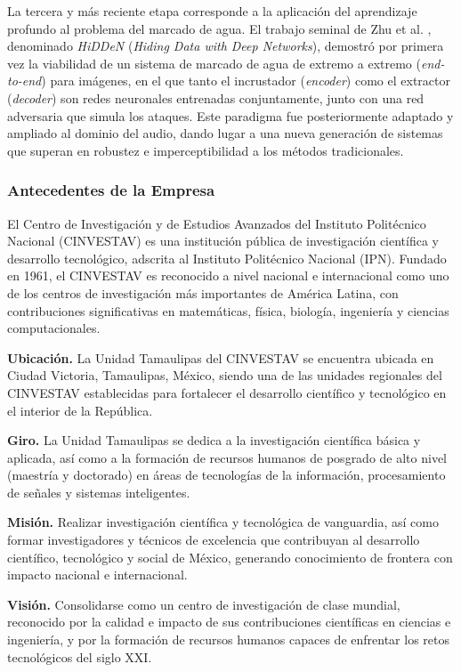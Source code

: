 La tercera y más reciente etapa corresponde a la aplicación del aprendizaje profundo al problema del marcado de agua. El trabajo seminal de Zhu et al. \cite{zhu2018hidden}, denominado \textit{HiDDeN} (\textit{Hiding Data with Deep Networks}), demostró por primera vez la viabilidad de un sistema de marcado de agua de extremo a extremo (\textit{end-to-end}) para imágenes, en el que tanto el incrustador (\textit{encoder}) como el extractor (\textit{decoder}) son redes neuronales entrenadas conjuntamente, junto con una red adversaria que simula los ataques. Este paradigma fue posteriormente adaptado y ampliado al dominio del audio, dando lugar a una nueva generación de sistemas que superan en robustez e imperceptibilidad a los métodos tradicionales.
\subsubsection{Antecedentes de la Empresa}
\label{subsec:antecedentes_empresa}

El Centro de Investigación y de Estudios Avanzados del Instituto Politécnico Nacional (CINVESTAV) es una institución pública de investigación científica y desarrollo tecnológico, adscrita al Instituto Politécnico Nacional (IPN). Fundado en 1961, el CINVESTAV es reconocido a nivel nacional e internacional como uno de los centros de investigación más importantes de América Latina, con contribuciones significativas en matemáticas, física, biología, ingeniería y ciencias computacionales.

\textbf{Ubicación.} La Unidad Tamaulipas del CINVESTAV se encuentra ubicada en Ciudad Victoria, Tamaulipas, México, siendo una de las unidades regionales del CINVESTAV establecidas para fortalecer el desarrollo científico y tecnológico en el interior de la República.

\textbf{Giro.} La Unidad Tamaulipas se dedica a la investigación científica básica y aplicada, así como a la formación de recursos humanos de posgrado de alto nivel (maestría y doctorado) en áreas de tecnologías de la información, procesamiento de señales y sistemas inteligentes.

\textbf{Misión.} Realizar investigación científica y tecnológica de vanguardia, así como formar investigadores y técnicos de excelencia que contribuyan al desarrollo científico, tecnológico y social de México, generando conocimiento de frontera con impacto nacional e internacional.

\textbf{Visión.} Consolidarse como un centro de investigación de clase mundial, reconocido por la calidad e impacto de sus contribuciones científicas en ciencias e ingeniería, y por la formación de recursos humanos capaces de enfrentar los retos tecnológicos del siglo XXI.


